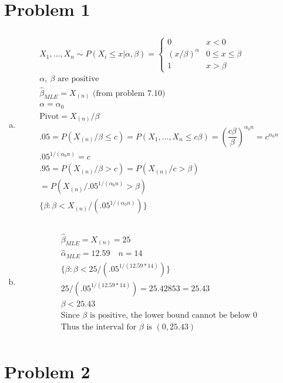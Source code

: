 \documentclass{article}
\newcommand{\B}{\beta}
\newcommand{\hb}{\hat{\beta}}
\newcommand{\Xn}{X_{(n)}}
\newcommand{\al}{\alpha}
\begin{document}
\begin{flushleft}

\section*{Problem 1}
\begin{enumerate}[(a)]
	
	\item 
\begin{multline*}\\
X_1,\dots,X_n \sim
P(X_i\leq x|\alpha,\B)=\begin{cases}
0  & x<0\\
(x/\B)^{\alpha}  & 0\leq x\leq\B\\
1  & x>\B
\end{cases}\\
\al, \ \B \text{ are positive}\\
\hat{\B}_{MLE}=X_{(n)} \text{ (from problem 7.10)}\\
\al=\al_0\\
\text{Pivot}=X_{(n)} /\B\\
.05=P(X_{(n)}/\B\leq c)=P(X_1,\dots,X_n\leq c\B)=\left(\dfrac{c\B}{\B}\right)^{\al_0n}=c^{\al_0n}\\
.05^{1/(\al_0n)}=c\\
.95=P(\Xn/\B>c)=P(\Xn/c>\B)\\
=P(\Xn/.05^{1/(\al_0n)}>\B)\\
\{\B:\B< \Xn/(.05^{1/(\al_0n)})\}\\
\end{multline*}

	\item 
\begin{multline*}\\
\hb_{MLE}=\Xn=25\\
\hat{\al}_{MLE}=12.59 \quad n=14\\
\{\B:\B< 25/(.05^{1/(12.59*14)})\}\\
25/(.05^{1/(12.59*14)})=25.42853=25.43\\
\B<25.43\\
\text{Since } \B \text{ is positive, the lower bound cannot be below 0}\\
\text{Thus the interval for } \B \text{ is } (0,25.43)\\
\end{multline*}

\end{enumerate}
\pagebreak
	\section*{Problem 2}
\begin{enumerate}[(a)]
	

\end{enumerate}
\end{flushleft}
\end{document}
